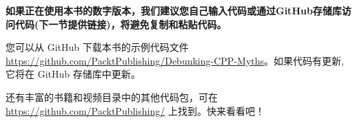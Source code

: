 \textbf{如果正在使用本书的数字版本，我们建议您自己输入代码或通过GitHub存储库访问代码(下一节提供链接)，将避免复制和粘贴代码。}


您可以从 GitHub 下载本书的示例代码文件 \url{https://github.com/PacktPublishing/Debunking-CPP-Myths}。如果代码有更新,它将在 GitHub 存储库中更新。

还有丰富的书籍和视频目录中的其他代码包，可在 \url{https://github.com/PacktPublishing/} 上找到。快来看看吧！







